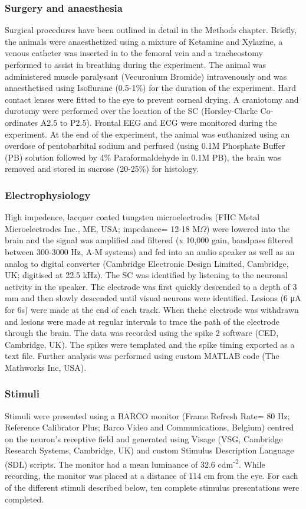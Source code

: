 	\subsubsection{Surgery and anaesthesia}
Surgical procedures have been outlined in detail in the Methods chapter.
Briefly, the animals were anaesthetized using a mixture of Ketamine and
Xylazine, a venous catheter was inserted in to the femoral vein and a
tracheostomy performed to assist in breathing during the experiment. The
animal was administered muscle paralysant (Vecuronium Bromide)
intravenously and was anaesthetised using Isoflurane (0.5-1\%) for the
duration of the experiment. Hard contact lenses were fitted to the eye
to prevent corneal drying. A craniotomy and durotomy were performed over
the location of the SC (Horsley-Clarke Co-ordinates A2.5 to P2.5).
Frontal EEG and ECG were monitored during the experiment. At the end of
the experiment, the animal was euthanized using an overdose of
pentobarbital sodium and perfused (using 0.1M Phosphate Buffer (PB)
solution followed by 4\% Paraformaldehyde in 0.1M PB), the brain was
removed and stored in sucrose (20-25\%) for histology.

	\subsubsection{Electrophysiology}
High impedence, lacquer coated tungsten microelectrodes (FHC Metal
Microelectrodes Inc., ME, USA; impedance= 12-18 M$\Omega$) were lowered into
the brain and the signal was amplified and filtered (x 10,000 gain,
bandpass filtered between 300-3000 Hz, A-M systems) and fed into an
audio speaker as well as an analog to digital converter (Cambridge
Electronic Design Limited, Cambridge, UK; digitised at 22.5 kHz). The SC
was identified by listening to the neuronal activity in the speaker. The
electrode was first quickly descended to a depth of 3 mm and then slowly
descended until visual neurons were identified. Lesions (6 μA for 6s)
were made at the end of each track. When thehe electrode was withdrawn
and lesions were made at regular intervals to trace the path of the
electrode through the brain. The data was recorded using the spike 2
software (CED, Cambridge, UK). The spikes were templated and the spike
timing exported as a text file. Further analysis was performed using
custom MATLAB code (The Mathworks Inc, USA).
	\subsubsection{Stimuli}
Stimuli were presented using a BARCO monitor (Frame Refresh Rate= 80 Hz;
Reference Calibrator Plus; Barco Video and Communications, Belgium)
centred on the neuron's receptive field and generated using Visage (VSG,
Cambridge Research Systems, Cambridge, UK) and custom Stimulus
Description Language (SDL) scripts. The monitor had a mean luminance of
32.6 cdm\textsuperscript{-2}. While recording, the monitor was placed at
a distance of 114 cm from the eye. For each of the different stimuli
described below, ten complete stimulus presentations were completed.

